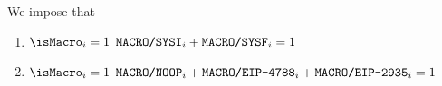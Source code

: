 We impose that
\begin{enumerate}
	\item \If $\isMacro _{i} = 1$ \Then $\texttt{MACRO}\texttt{/}{\texttt{\texttt{SYSI}}}    _{i} + \texttt{MACRO}\texttt{/}{\texttt{\texttt{SYSF}}}             _{i} = 1$
	\item \If $\isMacro _{i} = 1$ \Then $\texttt{MACRO}\texttt{/}{\texttt{\texttt{NOOP}}} _{i} + \texttt{MACRO}\texttt{/}{\texttt{\texttt{EIP-4788}}} _{i} + \texttt{MACRO}\texttt{/}{\texttt{\texttt{EIP-2935}}} _{i} = 1$
\end{enumerate}
